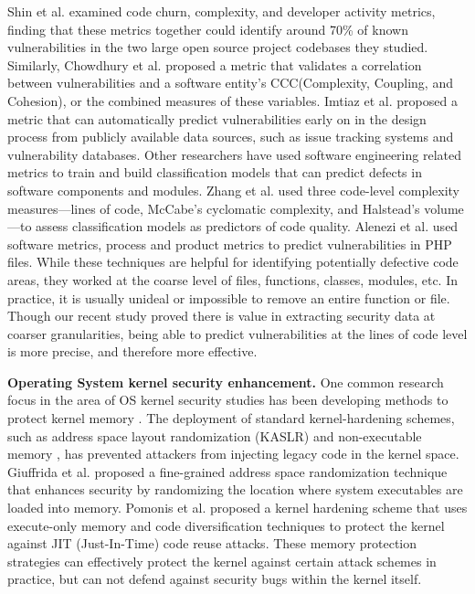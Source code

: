 Shin et al. \cite{Shin:2011:ECC} examined code churn, complexity, and developer activity metrics, finding that these metrics together could identify around 70\% of known vulnerabilities 
in the two large open source project codebases they studied. 
Similarly, Chowdhury et al. \cite{SAC10} proposed a metric that validates a correlation between vulnerabilities and a software entity’s CCC(Complexity, Coupling, and Cohesion), 
or the combined measures of these variables. Imtiaz et al. \cite{Imtiaz2018TowardsDV} proposed a metric that can automatically predict vulnerabilities early on in the design process from publicly available data sources, 
such as issue tracking systems and vulnerability databases. Other researchers have used software engineering related metrics to train and build classification models that can predict defects in software components and modules. 
Zhang et al. \cite{4459644} used three code-level complexity measures—lines of code, McCabe’s cyclomatic complexity, and Halstead’s volume—to assess classification models as predictors of code quality. 
Alenezi et al. \cite{Alenezi2015EvaluatingSM} used software metrics, process and product metrics to predict vulnerabilities in PHP files. 
While these techniques are helpful for identifying potentially defective code areas, they worked at the coarse level of files, functions, classes, modules, etc. 
In practice, it is usually unideal or impossible to remove an entire function or file. 
Though our recent study proved there is value in extracting security data at coarser granularities, 
being able to predict vulnerabilities at the lines of code level is more precise, and therefore more effective. 

\textbf{Operating System kernel security enhancement.} 
One common research focus in  the area of OS kernel security studies has been developing methods to protect kernel memory \cite{180231, KASLR, KIBSD, 10.1145/3277592}. 
The deployment of standard kernel-hardening schemes, such as address space layout randomization (KASLR) \cite{KASLR} and non-executable memory \cite{KIBSD}, 
has prevented attackers from injecting  legacy code in the kernel space. 
Giuffrida et al. \cite{180231} proposed a fine-grained address space randomization technique that enhances security by randomizing the location where system executables are loaded into memory. 
Pomonis et al. \cite{10.1145/3277592} proposed a kernel hardening scheme that uses execute-only memory and code diversification techniques to protect the kernel against JIT (Just-In-Time) code reuse attacks. 
These memory protection strategies can effectively protect the kernel against certain attack schemes in practice, but can not defend against security bugs within the kernel itself.

